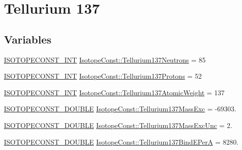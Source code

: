 \hypertarget{group___isotope_const-_tellurium-_te137}{}\section{Tellurium 137}
\label{group___isotope_const-_tellurium-_te137}
\subsection*{Variables}
\begin{DoxyCompactItemize}
\item 
\mbox{\hyperlink{group___isotope_const-_macros_ga5f18360b3e99483a35c32d789e62621c}{I\+S\+O\+T\+O\+P\+E\+C\+O\+N\+S\+T\+\_\+\+I\+NT}} \mbox{\hyperlink{group___isotope_const-_tellurium-_te137_ga4ef49b8b7c0e1c99600bb6e37ef35ece}{Isotope\+Const\+::\+Tellurium137\+Neutrons}} = 85
\item 
\mbox{\hyperlink{group___isotope_const-_macros_ga5f18360b3e99483a35c32d789e62621c}{I\+S\+O\+T\+O\+P\+E\+C\+O\+N\+S\+T\+\_\+\+I\+NT}} \mbox{\hyperlink{group___isotope_const-_tellurium-_te137_gaf9aab29db54ea0d6ea2b1700ac18f155}{Isotope\+Const\+::\+Tellurium137\+Protons}} = 52
\item 
\mbox{\hyperlink{group___isotope_const-_macros_ga5f18360b3e99483a35c32d789e62621c}{I\+S\+O\+T\+O\+P\+E\+C\+O\+N\+S\+T\+\_\+\+I\+NT}} \mbox{\hyperlink{group___isotope_const-_tellurium-_te137_ga89827280f25c8a5a24df27f7f2ea5e37}{Isotope\+Const\+::\+Tellurium137\+Atomic\+Weight}} = 137
\item 
\mbox{\hyperlink{group___isotope_const-_macros_ga8f45a7272ce02c0b4c65c44636ed719a}{I\+S\+O\+T\+O\+P\+E\+C\+O\+N\+S\+T\+\_\+\+D\+O\+U\+B\+LE}} \mbox{\hyperlink{group___isotope_const-_tellurium-_te137_ga922f63a8c768e578ebb815d91e83c041}{Isotope\+Const\+::\+Tellurium137\+Mass\+Exc}} = -\/69303.
\item 
\mbox{\hyperlink{group___isotope_const-_macros_ga8f45a7272ce02c0b4c65c44636ed719a}{I\+S\+O\+T\+O\+P\+E\+C\+O\+N\+S\+T\+\_\+\+D\+O\+U\+B\+LE}} \mbox{\hyperlink{group___isotope_const-_tellurium-_te137_ga016aceafbca3d3cba3b83ba80957decb}{Isotope\+Const\+::\+Tellurium137\+Mass\+Exc\+Unc}} = 2.
\item 
\mbox{\hyperlink{group___isotope_const-_macros_ga8f45a7272ce02c0b4c65c44636ed719a}{I\+S\+O\+T\+O\+P\+E\+C\+O\+N\+S\+T\+\_\+\+D\+O\+U\+B\+LE}} \mbox{\hyperlink{group___isotope_const-_tellurium-_te137_ga495e67ed43f1690526e8ac42a00b762b}{Isotope\+Const\+::\+Tellurium137\+Bind\+E\+PerA}} = 8280.
\item 

\end{DoxyCompactItemize}
